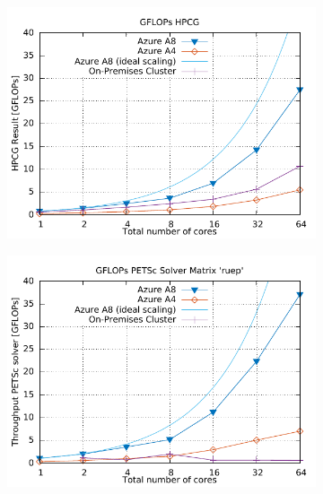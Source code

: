 \documentclass[a4paper,twoside]{article}
\begin{document}
\begin{figure}[!h]
\begin{subfigure}
	\centering
	\includegraphics[width=\linewidth]{gplt-gflops-hpcg}
\end{subfigure}
\begin{subfigure}
  \centering
	\includegraphics[width=\linewidth]{gplt-gflops-ruep}  
\end{subfigure}%


\end{figure}
\end{document}
